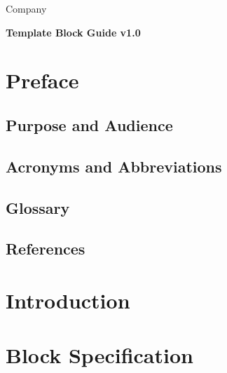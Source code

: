 \documentclass[11pt]{article}
\begin{document}
\thispagestyle{empty}

\begin{center}
\hspace*{3mm}
\begin{minipage}[tl]{12cm}
  \begin{center}
    {
      {\Large Company}
    }
  \end{center}
\end{minipage}
\end{center}

\vfill
{\LARGE
  \begin{center}
    \textbf{Template Block Guide v1.0} \\
    {\normalsize}
  \end{center}
}
\vfill
{\large

\newpage

\tableofcontents
\newpage
\listoffigures
\newpage
\listoftables

\newpage

\section{Preface}

  \subsection{Purpose and Audience}

  \subsection{Acronyms and Abbreviations}

  \subsection{Glossary}

  \subsection{References}

\newpage

\section{Introduction}

\newpage

\section{Block Specification}

}
\end{document}
